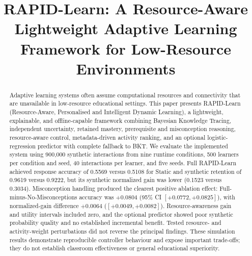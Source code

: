 \documentclass[conference]{IEEEtran}
\begin{document}
\title{RAPID-Learn: A Resource-Aware Lightweight Adaptive Learning Framework for Low-Resource Environments}

\author{
\and
{}
}

\maketitle

\begin{abstract}
Adaptive learning systems often assume computational resources and connectivity that are unavailable in low-resource educational settings. This paper presents RAPID-Learn (Resource-Aware, Personalised and Intelligent Dynamic Learning), a lightweight, explainable, and offline-capable framework combining Bayesian Knowledge Tracing, independent uncertainty, retained mastery, prerequisite and misconception reasoning, resource-aware control, metadata-driven activity ranking, and an optional logistic-regression predictor with complete fallback to BKT. We evaluate the implemented system using 900,000 synthetic interactions from nine runtime conditions, 500 learners per condition and seed, 40 interactions per learner, and five seeds. Full RAPID-Learn achieved response accuracy of 0.5569 versus 0.5108 for Static and synthetic retention of 0.9619 versus 0.9222, but its synthetic normalized gain was lower (0.1523 versus 0.3034). Misconception handling produced the clearest positive ablation effect: Full-minus-No-Misconceptions accuracy was $+0.0804$ (95\% CI $[+0.0772,+0.0825]$), with normalized-gain difference $+0.0064$ ($[+0.0049,+0.0082]$). Resource-awareness gain and utility intervals included zero, and the optional predictor showed poor synthetic probability quality and no established incremental benefit. Tested resource- and activity-weight perturbations did not reverse the principal findings. These simulation results demonstrate reproducible controller behaviour and expose important trade-offs; they do not establish classroom effectiveness or general educational superiority.
\end{abstract}
\end{document}
